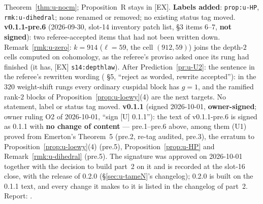 \documentclass[11pt]{article}
\begin{document}
Theorem~\ref{thm:u-nocm}; Proposition~R stays in [EX]. \textbf{Labels added}: \texttt{prop:u-HP}, \texttt{rmk:u-dihedral}; none renamed or removed;
no existing status tag moved.
\textbf{v0.1.1-pre.6} (2026-09-30, slot-14 inventory patch list, 
\S3 items 6--7, \textbf{not signed}): two referee-accepted items that had not been written down. Remark~\ref{rmk:u-zero}: $k=914$ ($\ell=59$,
the cell $(912,59)$) joins the depth-$2$ cells computed on cohomology, as the referee's proviso asked once its rung had finished (it has,
[EX] \texttt{s14:depthlaw}). After Prediction~\ref{pr:u-U2}: the \COMP{} sentence in the referee's rewritten wording
( \S5, ``reject as worded, rewrite accepted''): in the $320$ weight-shift rungs every ordinary cuspidal
block has $g=1$, and the ramified rank-$2$ blocks of Proposition~\ref{prop:u-loewy}(4) are the next targets. No statement, label or status tag moved.
\textbf{v0.1.1} (signed 2026-10-01, \textbf{owner-signed}; owner ruling O2 of 2026-10-01, ``sign [U] 0.1.1''): the text of v0.1.1-pre.6 is signed as 0.1.1 with
\textbf{no change of content} --- pre.1--pre.6 above, among them (U1) proved from Emerton's Theorem~5 (pre.2, re-tag audited, pre.3), the erratum to
Proposition~\ref{prop:u-loewy}(4) (pre.5), Proposition~\ref{prop:u-HP} and Remark~\ref{rmk:u-dihedral} (pre.5). The signature was approved on 2026-10-01 together
with the decision to build part~2 on it and is recorded at the slot-16 close, with the release of 0.2.0 (\S\ref{sec:u-tameN}'s changelog); 0.2.0 is built on the 0.1.1 text, and every change it makes to it is listed in the
changelog of part~2. Report: .
\end{document}
